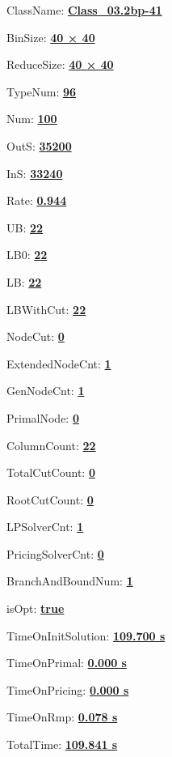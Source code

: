 \documentclass[11pt]{article}
\begin{document}
\pagestyle{empty}


ClassName: \underline{\textbf{Class_03.2bp-41}}
\par
BinSize: \underline{\textbf{40 × 40}}
\par
ReduceSize: \underline{\textbf{40 × 40}}
\par
TypeNum: \underline{\textbf{96}}
\par
Num: \underline{\textbf{100}}
\par
OutS: \underline{\textbf{35200}}
\par
InS: \underline{\textbf{33240}}
\par
Rate: \underline{\textbf{0.944}}
\par
UB: \underline{\textbf{22}}
\par
LB0: \underline{\textbf{22}}
\par
LB: \underline{\textbf{22}}
\par
LBWithCut: \underline{\textbf{22}}
\par
NodeCut: \underline{\textbf{0}}
\par
ExtendedNodeCnt: \underline{\textbf{1}}
\par
GenNodeCnt: \underline{\textbf{1}}
\par
PrimalNode: \underline{\textbf{0}}
\par
ColumnCount: \underline{\textbf{22}}
\par
TotalCutCount: \underline{\textbf{0}}
\par
RootCutCount: \underline{\textbf{0}}
\par
LPSolverCnt: \underline{\textbf{1}}
\par
PricingSolverCnt: \underline{\textbf{0}}
\par
BranchAndBoundNum: \underline{\textbf{1}}
\par
isOpt: \underline{\textbf{true}}
\par
TimeOnInitSolution: \underline{\textbf{109.700 s}}
\par
TimeOnPrimal: \underline{\textbf{0.000 s}}
\par
TimeOnPricing: \underline{\textbf{0.000 s}}
\par
TimeOnRmp: \underline{\textbf{0.078 s}}
\par
TotalTime: \underline{\textbf{109.841 s}}
\par
\newpage


\end{document}
